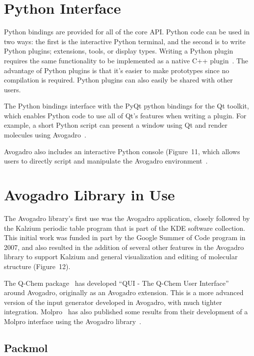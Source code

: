 \documentclass[10pt]{bmc_article}
\newenvironment{bmcformat}{\begin{raggedright}
  \baselineskip20pt\sloppy\setboolean{publ}{false}}{\end{raggedright}
  \baselineskip20pt\sloppy}
\begin{document}
\begin{bmcformat}
\section*{Python Interface}

Python bindings are provided for all of the core API. Python code can be used
in two ways: the first is the interactive Python terminal, and the second is to
write Python plugins; extensions, tools, or display types.
Writing a Python plugin requires the same functionality to be implemented as a
native C++ plugin~\cite{PythonExtensions}. The advantage of Python
plugins is that it's easier to make prototypes since no compilation is
required. Python plugins can also easily be shared with other users.

The Python bindings interface with the PyQt python bindings for the Qt
toolkit, which enables Python code to use all of Qt's features when writing a
plugin. For example, a short Python script can present a window using Qt and
render molecules using Avogadro~\cite{PythonWindowExample,PythonScripting,PyQtGist}.

Avogadro also includes an interactive Python console
(Figure~11, which allows users to directly script
and manipulate the Avogadro environment~\cite{PythonTerminalTutorial}.

\section*{Avogadro Library in Use}

The Avogadro library's first use was the Avogadro application, closely
followed by the Kalzium periodic table program that is part of the KDE software
collection. This initial work was funded in part by the Google Summer of Code
program in 2007, and also resulted in the addition of several other features in
the Avogadro library to support Kalzium and general visualization and editing
of molecular structure (Figure~12).

The Q-Chem package~\cite{Q-Chem3} has developed ``QUI - The Q-Chem User
Interface''~\cite{QUI} around Avogadro, originally as an Avogadro extension.
This is a more advanced version of the input generator developed in Avogadro,
with much tighter integration. Molpro~\cite{MOLPRO} has also published some
results from their development of a Molpro interface using the Avogadro
library~\cite{MOLPROGUI}.

\subsection*{Packmol}


\end{bmcformat}
\end{document}

